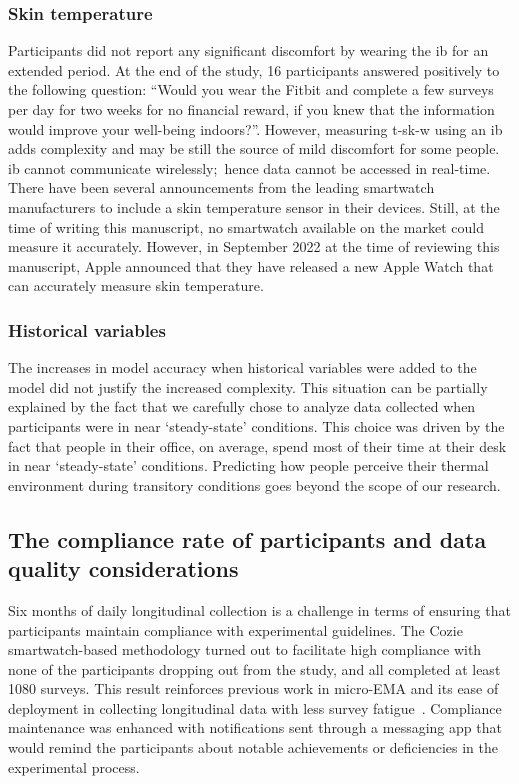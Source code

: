 \subsubsection{Skin temperature}
Participants did not report any significant discomfort by wearing the \gls{ib} for an extended period. 
At the end of the study, 16 participants answered positively to the following question: ``Would you wear the Fitbit and complete a few surveys per day for two weeks for no financial reward, if you knew that the information would improve your well-being indoors?''.
However, measuring \ac{t-sk-w} using an \gls{ib} adds complexity and may be still the source of mild discomfort for some people.
\gls{ib} cannot communicate wirelessly;\ hence data cannot be accessed in real-time.
There have been several announcements from the leading smartwatch manufacturers to include a skin temperature sensor in their devices.
Still, at the time of writing this manuscript, no smartwatch available on the market could measure it accurately.
However, in  September 2022 at the time of reviewing this manuscript, Apple announced that they have released a new Apple Watch that can accurately measure skin temperature.

\subsubsection{Historical variables}
The increases in model accuracy when historical variables were added to the model did not justify the increased complexity.
This situation can be partially explained by the fact that we carefully chose to analyze data collected when participants were in near `steady-state' conditions.
This choice was driven by the fact that people in their office, on average, spend most of their time at their desk in near `steady-state' conditions.
Predicting how people perceive their thermal environment during transitory conditions goes beyond the scope of our research.

\subsection{The compliance rate of participants and data quality considerations}\label{subsec:compliance}
Six months of daily longitudinal collection is a challenge in terms of ensuring that participants maintain compliance with experimental guidelines.
The Cozie smartwatch-based methodology turned out to facilitate high compliance with none of the participants dropping out from the study, and all completed at least 1080 surveys. 
This result reinforces previous work in micro-EMA and its ease of deployment in collecting longitudinal data with less survey fatigue~\cite{Intille2016-xb}.
Compliance maintenance was enhanced with notifications sent through a messaging app that would remind the participants about notable achievements or deficiencies in the experimental process. 

